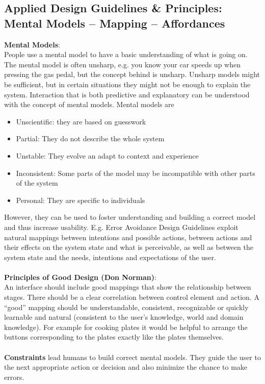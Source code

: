 \subsection{Applied Design Guidelines \& Principles: Mental Models -- Mapping -- Affordances}
\textbf{Mental Models}: \\
People use a mental model to have a basic understanding of what is going on. The mental model is often unsharp, e.g. you know your car speeds up when pressing the gas pedal, but the concept behind is unsharp. Unsharp models might be sufficient, but in certain situations they might not be enough to explain the system. Interaction that is both predictive and explanatory can be understood with the concept of mental models. Mental models are
\begin{itemize}
\item Unscientific: they are based on guesswork
\item Partial: They do not describe the whole system
\item Unstable: They evolve an adapt to context and experience
\item Inconsistent: Some parts of the model may be incompatible with other parts of the system
\item Personal: They are specific to individuals
\end{itemize}
However, they can be used to foster understanding and building a correct model and thus increase usability. E.g. Error Avoidance Design Guidelines exploit natural mappings between intentions and possible actions, between actions and their effects on the system state and what is perceivable, as well as between the system state and the needs, intentions and expectations of the user.\\\\
\textbf{Principles of Good Design (Don Norman)}:\\
An interface should include good mappings that show the relationship between stages. There should be a clear correlation between control element and action. A ``good'' mapping should be understandable, consistent, recognizable or quickly learnable and natural (consistent to the user's knowledge, world and domain knowledge). For example for cooking plates it would be helpful to arrange the buttons corresponding to the plates exactly like the plates themselves.\\ \\
\textbf{Constraints} lead humans to build correct mental models. They guide the user to the next appropriate action or decision and also minimize the chance to make errors.
